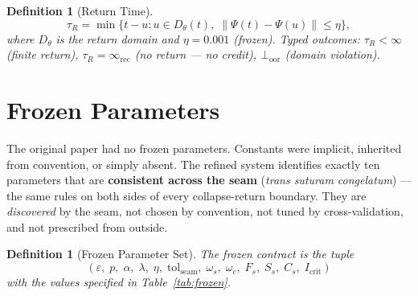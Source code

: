 \documentclass[
  aps,
  prd,
  preprint,
  superscriptaddress,
  nofootinbib,
  floatfix,
  longbibliography
]{revtex4-2}
\newtheorem{definition}[theorem]{Definition}
\newcommand{\tR}{\tau_{\!R}}
\newcommand{\eps}{\varepsilon}
\newcommand{\tolseam}{\mathrm{tol}_{\mathrm{seam}}}
\newcommand{\beq}{\begin{equation}}
\newcommand{\eeq}{\end{equation}}
\newcommand{\Fid}{F}
\newcommand{\Drft}{\omega}
\newcommand{\Ent}{S}
\newcommand{\Curv}{C}
\newcommand{\Psifield}{\Psi}
\newcommand{\lat}[1]{\textit{#1}}
\begin{document}
\begin{definition}[Return Time]\label{def:tR}
\beq
  \tR = \min\bigl\{t - u : u \in D_\theta(t),\;
    \|\Psifield(t) - \Psifield(u)\| \leq \eta\bigr\},
\eeq
where $D_\theta$ is the return domain and $\eta = 0.001$ (frozen).
Typed outcomes: $\tR < \infty$ (finite return),
$\tR = \infty_{\mathrm{rec}}$ (no return — no credit),
$\bot_{\mathrm{oor}}$ (domain violation).
\end{definition}

\section{Frozen Parameters}\label{sec:frozen}

The original paper had no frozen parameters. Constants were
implicit, inherited from convention, or simply absent.
The refined system identifies exactly ten parameters that are
\textbf{consistent across the seam}
(\lat{trans suturam congelatum}) — the same rules on both
sides of every collapse-return boundary. They are
\emph{discovered} by the seam, not chosen by convention,
not tuned by cross-validation, and not prescribed from outside.

\begin{definition}[Frozen Parameter Set]\label{def:frozen}
The frozen contract is the tuple
\begin{equation*}
(\eps,\; p,\; \alpha,\; \lambda,\; \eta,\;
  \tolseam,\; \Drft_s,\; \Drft_c,\;
  \Fid_s,\; \Ent_s,\; \Curv_s,\; I_{\mathrm{crit}})
\end{equation*}
with the values specified in Table~\ref{tab:frozen}.
\end{definition}
\end{document}
